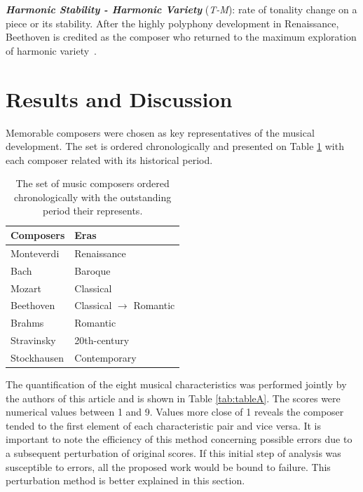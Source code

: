 \documentclass[
 aip,
 jmp,
 amsmath,amssymb,
 reprint,
]{revtex4-1}
\begin{document}
{\bf \em{ Harmonic Stability - Harmonic Variety}} (\emph{T-M}):
rate of tonality change on a piece or its stability. After the highly
polyphony development in Renaissance, Beethoven is credited as the
composer who returned to the maximum exploration of harmonic variety~\cite{Webern}.

\section{Results and Discussion}

Memorable composers were chosen as key representatives
of the musical development. The set
is ordered chronologically and presented on Table \ref{tab:table0} with
each composer related with its historical period.

\begin{table}[ht]
\caption{\label{tab:table0} The set of music composers ordered chronologically
with the outstanding period their represents.}

\begin{tabular}{|l||l|}
\hline

 Composers       &  Eras \\ \hline

 Monteverdi      & Renaissance \\
 Bach            & Baroque \\
 Mozart          & Classical \\
 Beethoven       & Classical $\to$ Romantic \\
 Brahms          & Romantic \\
 Stravinsky      & 20th-century \\
 Stockhausen     & Contemporary\\

\hline
\end{tabular}
\end{table}

The quantification of the eight musical
characteristics was performed jointly by the authors of this
article and is shown in Table \ref{tab:tableA}. The scores were
numerical values between 1 and 9. Values more close of 1 reveals the
composer tended to the first element of each characteristic pair and
vice versa. It is important to note the efficiency of this method
concerning possible errors due to a subsequent perturbation of
original scores. If this initial step of analysis was susceptible to
errors, all the proposed work would be bound to failure. This
perturbation method is better explained in this section.
\end{document}
